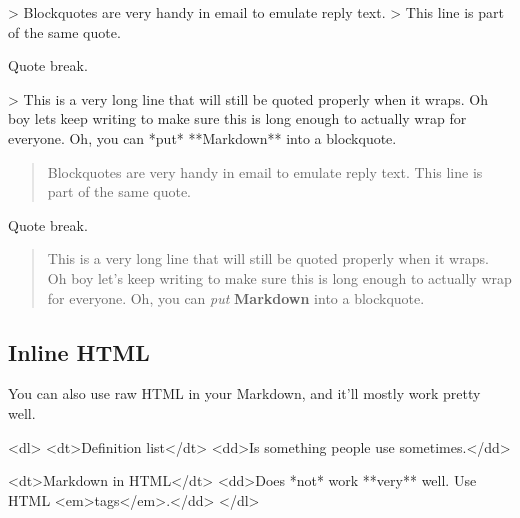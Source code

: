 \documentclass[
]{tufte-pandoc}
\newenvironment{Shaded}{}{}
\newcommand{\NormalTok}[1]{#1}
\begin{document}
\begin{Shaded}
\begin{Highlighting}[]
\NormalTok{\textgreater{} Blockquotes are very handy in email to emulate reply text.}
\NormalTok{\textgreater{} This line is part of the same quote.}

\NormalTok{Quote break.}

\NormalTok{\textgreater{} This is a very long line that will still be quoted properly when it wraps. Oh boy let\textquotesingle{}s keep writing to make sure this is long enough to actually wrap for everyone. Oh, you can *put* **Markdown** into a blockquote.}
\end{Highlighting}
\end{Shaded}

\begin{quote}
Blockquotes are very handy in email to emulate reply text. This line is
part of the same quote.
\end{quote}

Quote break.

\begin{quote}
This is a very long line that will still be quoted properly when it
wraps. Oh boy let's keep writing to make sure this is long enough to
actually wrap for everyone. Oh, you can \emph{put} \textbf{Markdown}
into a blockquote.
\end{quote}

\hypertarget{inline-html}{%
\subsection{Inline HTML}\label{inline-html}}

You can also use raw HTML in your Markdown, and it'll mostly work pretty
well.

\begin{Shaded}
\begin{Highlighting}[]
\NormalTok{\textless{}dl\textgreater{}}
\NormalTok{  \textless{}dt\textgreater{}Definition list\textless{}/dt\textgreater{}}
\NormalTok{  \textless{}dd\textgreater{}Is something people use sometimes.\textless{}/dd\textgreater{}}

\NormalTok{  \textless{}dt\textgreater{}Markdown in HTML\textless{}/dt\textgreater{}}
\NormalTok{  \textless{}dd\textgreater{}Does *not* work **very** well. Use HTML \textless{}em\textgreater{}tags\textless{}/em\textgreater{}.\textless{}/dd\textgreater{}}
\NormalTok{\textless{}/dl\textgreater{}}
\end{Highlighting}
\end{Shaded}
\end{document}
